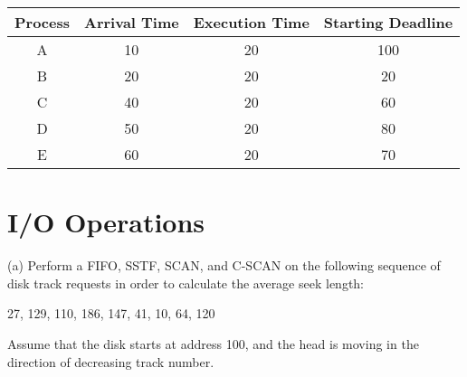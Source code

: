 \documentclass{article}
\begin{document}
\vspace{0.5cm}
\begin{center}
\begin{tabular}{|c|c|c|c|}
\hline
Process & Arrival Time & Execution Time & Starting Deadline\\
\hline
A & 10 & 20 & 100\\
B & 20 & 20 & 20\\
C & 40 & 20 & 60\\
D & 50 & 20 & 80\\
E & 60 & 20 & 70\\
\hline
\end{tabular}

\vspace{0.5cm}
\end{center}
\newpage



\section{I/O Operations}
(a) Perform a FIFO, SSTF, SCAN, and C-SCAN on the following sequence of disk track requests
in order to calculate the average seek length:
\begin{center}
27, 129, 110, 186, 147, 41, 10, 64, 120
\end{center}
Assume that the disk starts at address 100, and the head is moving in the direction
of decreasing track number.
\end{document}
